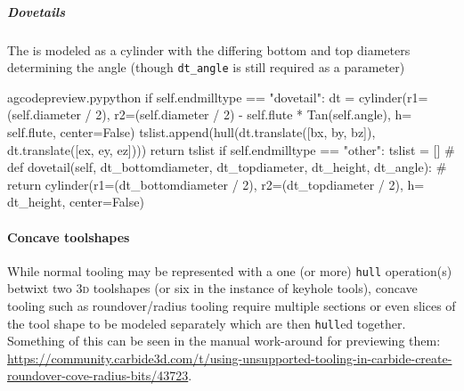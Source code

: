 \documentclass{ltxdoc}
\begin{document}
%
%


\subparagraph{Dovetails}

\label{subpara:dovetails}The  is modeled as a cylinder with the differing bottom and top diameters determining the angle (though \verb|dt_angle| is still required as a parameter)

\lstset{firstnumber=\thegcpy}
\begin{writecode}{a}{gcodepreview.py}{python}
        if self.endmilltype == "dovetail":
            dt = cylinder(r1=(self.diameter / 2), r2=(self.diameter / 2) - self.flute * Tan(self.angle), h= self.flute, center=False)
            tslist.append(hull(dt.translate([bx, by, bz]), dt.translate([ex, ey, ez])))
            return tslist
        if self.endmilltype == "other":
            tslist = []
#    def dovetail(self, dt_bottomdiameter, dt_topdiameter, dt_height, dt_angle):
#        return cylinder(r1=(dt_bottomdiameter / 2), r2=(dt_topdiameter / 2), h= dt_height, center=False)

\end{writecode}
\addtocounter{gcpy}{9}


\paragraph{Concave toolshapes}
\label{para:concavetoolshapes} 
While normal tooling may be represented with a one (or more) \texttt{hull} operation(s) betwixt two \textsc{3d} toolshapes (or six in the instance of keyhole tools), concave tooling such as roundover/radius tooling require multiple sections or even slices of the tool shape to be modeled separately which are then \texttt{hull}ed together. Something of this can be seen in the manual work-around for previewing them: \url{https://community.carbide3d.com/t/using-unsupported-tooling-in-carbide-create-roundover-cove-radius-bits/43723}.
\end{document}
